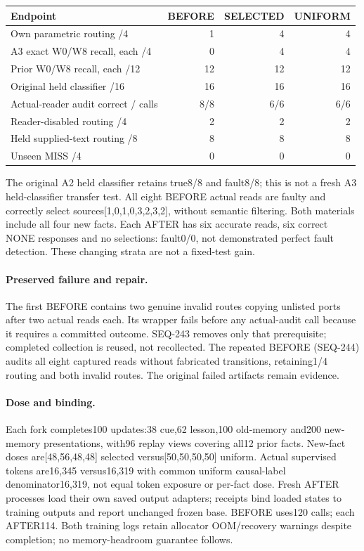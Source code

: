 \documentclass{article}
\begin{document}
\begin{center}
\small
\begin{tabular}{lrrr}
\toprule
Endpoint & BEFORE & SELECTED & UNIFORM \\
\midrule
Own parametric routing /4 & 1 & 4 & 4 \\
A3 exact W0/W8 recall, each /4 & 0 & 4 & 4 \\
Prior W0/W8 recall, each /12 & 12 & 12 & 12 \\
Original held classifier /16 & 16 & 16 & 16 \\
Actual-reader audit correct / calls & 8/8 & 6/6 & 6/6 \\
Reader-disabled routing /4 & 2 & 2 & 2 \\
Held supplied-text routing /8 & 8 & 8 & 8 \\
Unseen MISS /4 & 0 & 0 & 0 \\
\bottomrule
\end{tabular}
\end{center}

The original A2 held classifier retains true8/8 and fault8/8; this is not a
fresh A3 held-classifier transfer test. All eight BEFORE actual reads are
faulty and correctly select sources[1,0,1,0,3,2,3,2], without semantic filtering.
Both materials include all four new facts. Each AFTER has six accurate reads,
six correct NONE responses and no selections: fault0/0, not demonstrated
perfect fault detection. These changing strata are not a fixed-test gain.

\paragraph{Preserved failure and repair.}
The first BEFORE contains two genuine invalid routes copying unlisted ports
after two actual reads each. Its wrapper fails before any actual-audit call
because it requires a committed outcome. SEQ-243 removes only that prerequisite;
completed collection is reused, not recollected. The repeated BEFORE (SEQ-244)
audits all eight captured reads without fabricated transitions, retaining1/4
routing and both invalid routes. The original failed artifacts remain evidence.

\paragraph{Dose and binding.}
Each fork completes100 updates:38 cue,62 lesson,100 old-memory and200 new-memory
presentations, with96 replay views covering all12 prior facts. New-fact doses
are[48,56,48,48] selected versus[50,50,50,50] uniform. Actual supervised tokens
are16,345 versus16,319 with common uniform causal-label denominator16,319,
not equal token exposure or per-fact dose. Fresh AFTER processes load their
own saved output adapters; receipts bind loaded states to training outputs and
report unchanged frozen base. BEFORE uses120 calls; each AFTER114.
Both training logs retain allocator OOM/recovery warnings despite completion;
no memory-headroom guarantee follows.
\end{document}

